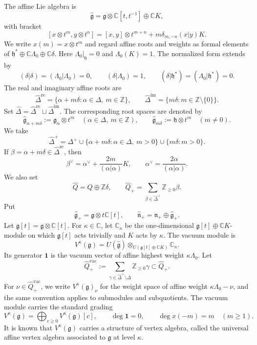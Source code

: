 \documentclass[11pt,a4paper]{amsart}
\newcommand{\CC}{\mathbb C}
\newcommand{\ZZ}{\mathbb Z}
\theoremstyle{plain}
\numberwithin{equation}{section}
\newcommand{\kg}{\mathfrak{g}}
\def\geq{\geqslant}
\begin{document}
The affine Lie algebra is
\[
\widehat{\mathfrak g}
=\mathfrak g\otimes\CC[t,t^{-1}]\oplus\CC K,
\]
with bracket
\[
[x\otimes t^m,y\otimes t^n]
=[x,y]\otimes t^{m+n}
+m\delta_{m,-n}(x|y)K.
\]
We write $x(m)=x\otimes t^m$ and regard affine roots and weights as formal elements of
\(\mathfrak h^*\oplus\CC\Lambda_0\oplus\CC\delta\).
Here $\Lambda_0|_{\mathfrak h}=0$ and $\Lambda_0(K)=1$. The
normalized form extends by
\[
(\delta|\delta)=(\Lambda_0|\Lambda_0)=0,
\qquad
(\delta|\Lambda_0)=1,
\qquad
(\delta|\mathfrak h^*)=(\Lambda_0|\mathfrak h^*)=0.
\]
The real and imaginary affine roots are
\[
\widehat\Delta^{\mathrm{re}}
=\{\alpha+m\delta:\alpha\in\Delta,\ m\in\ZZ\},
\qquad
\widehat\Delta^{\mathrm{im}}
=\{m\delta:m\in\ZZ\setminus\{0\}\}.
\]
Set
\(
\widehat\Delta
=\widehat\Delta^{\mathrm{re}}\sqcup\widehat\Delta^{\mathrm{im}}
\). The corresponding root spaces are denoted by
\[
\widehat{\mathfrak g}_{\alpha+m\delta}
:=\mathfrak g_\alpha\otimes t^m
\quad(\alpha\in\Delta,\ m\in\ZZ),
\qquad
\widehat{\mathfrak g}_{m\delta}
:=\mathfrak h\otimes t^m
\quad(m\ne0).
\]
We take
\[
\widehat\Delta^+
=\Delta^+
\cup\{\alpha+m\delta:\alpha\in\Delta,\ m>0\}
\cup\{m\delta:m>0\}.
\]
If
$\beta=\alpha+m\delta\in\widehat\Delta^{\mathrm{re}}$, then
\[
\beta^\vee
=\alpha^\vee+\frac{2m}{(\alpha|\alpha)}K,
\qquad
\alpha^\vee=\frac{2\alpha}{(\alpha|\alpha)}.
\]
We also set
\[
\widehat Q=Q\oplus\ZZ\delta,
\qquad
\widehat Q_+
=\sum_{\beta\in\widehat\Delta^+}\ZZ_{\geq0}\beta.
\]
Put
\[
\widehat{\mathfrak g}_+
=\mathfrak g\otimes t\CC[t],
\qquad
\widehat{\mathfrak n}_+
=\mathfrak n_+\oplus\widehat{\mathfrak g}_+.
\]
Let $\mathfrak g[t]=\mathfrak g\otimes\CC[t]$. For $\kappa\in\CC$, let
$\CC_\kappa$ be the one-dimensional
$\mathfrak g[t]\oplus\CC K$-module on which $\mathfrak g[t]$ acts
trivially and $K$ acts by $\kappa$. The vacuum module is
\[
V^\kappa(\mathfrak g)
=U(\widehat{\mathfrak g})
\otimes_{U(\mathfrak g[t]\oplus\CC K)}\CC_\kappa.
\]
Its generator $\mathbf1$ is the vacuum vector of affine highest
weight $\kappa\Lambda_0$. Let
\[
\widehat Q_+^{\mathrm{vac}}
:=\sum_{\gamma\in\widehat\Delta^+\setminus\Delta}
\ZZ_{\geq0}\gamma
\subset\widehat Q_+.
\]
For \(\nu\in\widehat Q_+^{\mathrm{vac}}\), we write
\(V^\kappa(\mathfrak g)_\nu\) for the weight space of affine weight
\(\kappa\Lambda_0-\nu\), and the same convention applies to submodules and
subquotients.
The vacuum module carries the standard grading
\[
V^\kappa(\mathfrak g)
=\bigoplus_{c\geq0}V^\kappa(\mathfrak g)[c],
\qquad
\deg\mathbf1=0,
\qquad
\deg x(-m)=m\quad(m\geq1).
\]
 It is known that  $V^\kappa(\kg)$ carries a structure of vertex algebra, called the universal affine vertex algebra associated to $\mathfrak{g}$ at level $\kappa$\cite{FZ92,LL04}.
 
\end{document}
